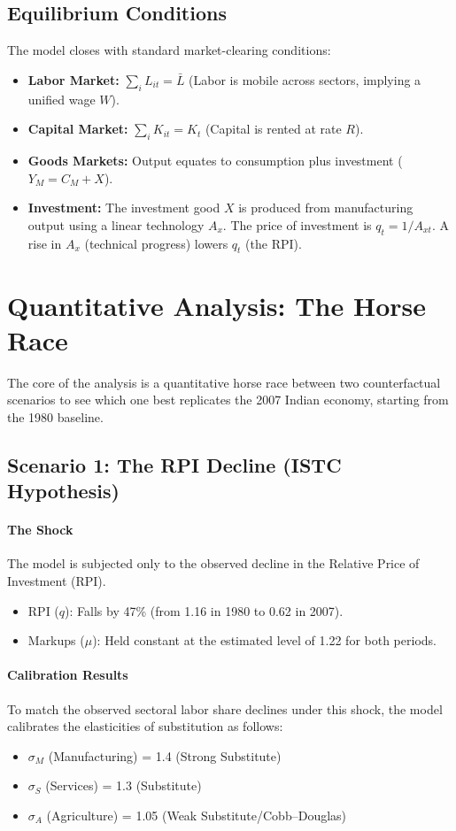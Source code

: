 \documentclass[12pt]{article}
\begin{document}
\subsection{Equilibrium Conditions}
The model closes with standard market-clearing conditions:
\begin{itemize}[leftmargin=*,itemsep=4pt]
\item \textbf{Labor Market:} $\sum_i L_{it} = \bar{L}$ (Labor is mobile across sectors, implying a unified wage $W$).
\item \textbf{Capital Market:} $\sum_i K_{it} = K_t$ (Capital is rented at rate $R$).
\item \textbf{Goods Markets:} Output equates to consumption plus investment ($Y_M = C_M + X$).
\item \textbf{Investment:} The investment good $X$ is produced from manufacturing output using a linear technology $A_x$. The price of investment is $q_t = 1/A_{xt}$. A rise in $A_x$ (technical progress) lowers $q_t$ (the RPI).
\end{itemize}

\newpage
\section{Quantitative Analysis: The Horse Race}

The core of the analysis is a quantitative horse race between two counterfactual scenarios to see which one best replicates the 2007 Indian economy, starting from the 1980 baseline.

\subsection{Scenario 1: The RPI Decline (ISTC Hypothesis)}
\paragraph{The Shock}
The model is subjected only to the observed decline in the Relative Price of Investment (RPI).
\begin{itemize}[leftmargin=*,itemsep=4pt]
\item RPI ($q$): Falls by 47\% (from 1.16 in 1980 to 0.62 in 2007).
\item Markups ($\mu$): Held constant at the estimated level of 1.22 for both periods.
\end{itemize}

\paragraph{Calibration Results}
To match the observed sectoral labor share declines under this shock, the model calibrates the elasticities of substitution as follows:
\begin{itemize}[leftmargin=*,itemsep=4pt]
\item $\sigma_M$ (Manufacturing) = 1.4 (Strong Substitute)
\item $\sigma_S$ (Services) = 1.3 (Substitute)
\item $\sigma_A$ (Agriculture) = 1.05 (Weak Substitute/Cobb--Douglas)
\end{itemize}
\end{document}
